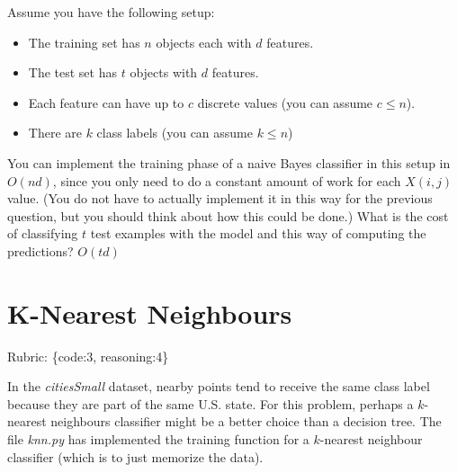 \documentclass{article}
\def\rubric#1{\gre{Rubric: \{#1\}}}{}
\def\blu#1{{\color{blu}#1}}
\def\gre#1{{\color{gre}#1}}
\def\red#1{{\color{red}#1}}
\def\items#1{\begin{itemize}#1\end{itemize}}
\begin{document}
Assume you have the following setup:
\items{
\item The training set has $n$ objects each with $d$ features.
\item The test set has $t$ objects with $d$ features.
\item Each feature can have up to $c$ discrete values (you can assume $c \leq n$).
\item There are $k$ class labels (you can assume $k \leq n$)
}
You can implement the training phase of a naive Bayes classifier in this setup in $O(nd)$, since you only need to do a constant amount of work for each $X(i,j)$ value. (You do not have to actually implement it in this way for the previous question, but you should think about how this could be done.)
 \blu{What is the cost of classifying $t$ test examples with the model and this way of computing the predictions?} \red{$O(td)$}


\section{K-Nearest Neighbours}
\rubric{code:3, reasoning:4}

In the \emph{citiesSmall} dataset, nearby points tend to receive the same class label because they are part of the same U.S. state. For this problem, perhaps a $k$-nearest neighbours classifier might be a better choice than a decision tree. The file \emph{knn.py} has implemented the training function for a $k$-nearest neighbour classifier (which is to just memorize the data).
\end{document}

